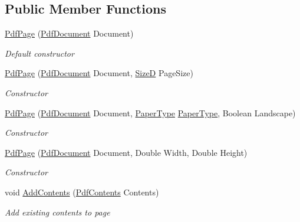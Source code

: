 \subsection*{Public Member Functions}
\begin{DoxyCompactItemize}
\item 
\hyperlink{class_pdf_file_writer_1_1_pdf_page_ad82bbe682f7a6245b1087cbefd0f9a80}{Pdf\+Page} (\hyperlink{class_pdf_file_writer_1_1_pdf_document}{Pdf\+Document} Document)
\begin{DoxyCompactList}\small\item\em Default constructor \end{DoxyCompactList}\item 
\hyperlink{class_pdf_file_writer_1_1_pdf_page_ab43af23bba9ac318f84f6532e2be5860}{Pdf\+Page} (\hyperlink{class_pdf_file_writer_1_1_pdf_document}{Pdf\+Document} Document, \hyperlink{class_pdf_file_writer_1_1_size_d}{SizeD} Page\+Size)
\begin{DoxyCompactList}\small\item\em Constructor \end{DoxyCompactList}\item 
\hyperlink{class_pdf_file_writer_1_1_pdf_page_af98e8034f9c368ef4cc0102efffbe0c6}{Pdf\+Page} (\hyperlink{class_pdf_file_writer_1_1_pdf_document}{Pdf\+Document} Document, \hyperlink{namespace_pdf_file_writer_a75284a02a7aac96778d2e1f95f406dfb}{Paper\+Type} \hyperlink{namespace_pdf_file_writer_a75284a02a7aac96778d2e1f95f406dfb}{Paper\+Type}, Boolean Landscape)
\begin{DoxyCompactList}\small\item\em Constructor \end{DoxyCompactList}\item 
\hyperlink{class_pdf_file_writer_1_1_pdf_page_ab84caf005de5b7bab126f3a527b38df0}{Pdf\+Page} (\hyperlink{class_pdf_file_writer_1_1_pdf_document}{Pdf\+Document} Document, Double Width, Double Height)
\begin{DoxyCompactList}\small\item\em Constructor \end{DoxyCompactList}\item 
void \hyperlink{class_pdf_file_writer_1_1_pdf_page_a0b19b9cf02fc44c6e3af41030c3ba918}{Add\+Contents} (\hyperlink{class_pdf_file_writer_1_1_pdf_contents}{Pdf\+Contents} Contents)
\begin{DoxyCompactList}\small\item\em Add existing contents to page \end{DoxyCompactList}\item 

\end{DoxyCompactItemize}
